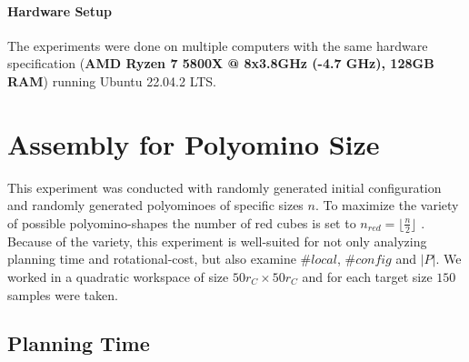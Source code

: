 \paragraph{Hardware Setup}
The experiments were done on multiple computers with the same hardware specification (\textbf{AMD Ryzen 7 5800X @ 8x3.8GHz (-4.7 GHz), 128GB RAM}) running Ubuntu 22.04.2 LTS.





\section{Assembly for Polyomino Size}
\label{sec:AFN}

This experiment was conducted with randomly generated initial configuration and randomly generated polyominoes of specific sizes $n$.
To maximize the variety of possible polyomino-shapes the number of red cubes is set to $n_\textit{red} = \lfloor \frac{n}{2} \rfloor$ \cite{Lu2021}.
Because of the variety, this experiment is well-suited for not only analyzing planning time and rotational-cost, but also examine $\#\textit{local}$, $\#\textit{config}$ and $|P|$.
We worked in a quadratic workspace of size $50 r_C \times 50 r_C$ and for each target size $150$ samples were taken.

\subsection{Planning Time}

